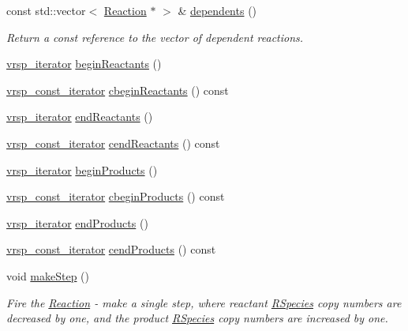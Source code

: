\begin{DoxyCompactItemize}
const std\-::vector$<$ \hyperlink{classchem_1_1Reaction}{Reaction} $\ast$ $>$ \& \hyperlink{classchem_1_1Reaction_af001778d48ac0800beba1b7031aeab33}{dependents} ()
\begin{DoxyCompactList}\small\item\em Return a const reference to the vector of dependent reactions. \end{DoxyCompactList}\item 
\hyperlink{namespacechem_a9b02b32d43473a3cd87fd30f910cc121}{vrsp\-\_\-iterator} \hyperlink{classchem_1_1Reaction_a7637b6f060d8d1ca859d89966ccfd39e}{begin\-Reactants} ()
\item 
\hyperlink{namespacechem_ab6ba36c9953625b15ff4105e1cdfdb86}{vrsp\-\_\-const\-\_\-iterator} \hyperlink{classchem_1_1Reaction_a84a70eef65b79375f92a0b702883da54}{cbegin\-Reactants} () const 
\item 
\hyperlink{namespacechem_a9b02b32d43473a3cd87fd30f910cc121}{vrsp\-\_\-iterator} \hyperlink{classchem_1_1Reaction_a14336488f8477a51295ae8a6e68aacda}{end\-Reactants} ()
\item 
\hyperlink{namespacechem_ab6ba36c9953625b15ff4105e1cdfdb86}{vrsp\-\_\-const\-\_\-iterator} \hyperlink{classchem_1_1Reaction_a0df8820ef13d8ba3014b610b1aeeed9e}{cend\-Reactants} () const 
\item 
\hyperlink{namespacechem_a9b02b32d43473a3cd87fd30f910cc121}{vrsp\-\_\-iterator} \hyperlink{classchem_1_1Reaction_abd8e1fd6c8f8d247896fc15ebdd02dbc}{begin\-Products} ()
\item 
\hyperlink{namespacechem_ab6ba36c9953625b15ff4105e1cdfdb86}{vrsp\-\_\-const\-\_\-iterator} \hyperlink{classchem_1_1Reaction_a369a58328dc07d471ab884924872ba4d}{cbegin\-Products} () const 
\item 
\hyperlink{namespacechem_a9b02b32d43473a3cd87fd30f910cc121}{vrsp\-\_\-iterator} \hyperlink{classchem_1_1Reaction_a3d432b1719243cf0bb3259071c488afd}{end\-Products} ()
\item 
\hyperlink{namespacechem_ab6ba36c9953625b15ff4105e1cdfdb86}{vrsp\-\_\-const\-\_\-iterator} \hyperlink{classchem_1_1Reaction_a666cd5d81c28e29af77cabcbd3846540}{cend\-Products} () const 
\item 
void \hyperlink{classchem_1_1Reaction_a1341d466157788c3d547da52c6c59502}{make\-Step} ()
\begin{DoxyCompactList}\small\item\em Fire the \hyperlink{classchem_1_1Reaction}{Reaction} -\/ make a single step, where reactant \hyperlink{classchem_1_1RSpecies}{R\-Species} copy numbers are decreased by one, and the product \hyperlink{classchem_1_1RSpecies}{R\-Species} copy numbers are increased by one. \end{DoxyCompactList}\item 

\end{DoxyCompactItemize}
